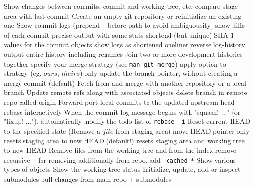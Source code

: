 	{Show changes between commits, commit and working tree, etc.}
	{compare stage area with last commit}
	{Create an empty git repository or reinitialize an existing one}
	{Show commit logs (prepend {\tt --} before path to avoid ambiguousity)}
	{show diffs of each commit}
	{precise output with some stats}
	{shortend (but unique) SHA-1 values for the commit objects }
	{show logs as shortened oneliner}
	{reverse log-history output}
	{entire history including renames}
	{Join two or more development histories together}
	{specify your merge strategy (see {\tt man git-merge})}
	{apply option to strategy (eg. $ours$, $theirs$)}
	{only update the branch pointer, without creating a merge commit (default)}
	{Fetch from and merge with another re\-pository or a local branch}
	{Update remote refs along with associated objects}
	{delete branch in remote repo called origin}
	{Forward-port local commits to the updated upstream head}
	{rebase interactively}
	{When the commit log message begins with "squash! ..." (or "fixup! ..."), automatically modify the todo list of {\tt rebase -i} }
	{Reset current HEAD to the specified state (Remove a $file$ from staging area)}
	{move HEAD pointer only}
	{resets staging area to new HEAD (default!)}
	{resets staging area and working tree to new HEAD}
	{Remove files from the working tree and from the index}
	{remove recursive -- for removing additionally from repo, add
{\tt --cached *}}
	{Show various types of objects}
	{Show the working tree status}
	{Initialize, update, add or inspect submodules}
	{pull changes from main repo + submodules}

